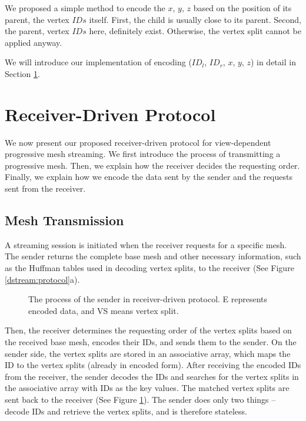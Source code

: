     We proposed a simple method to encode the $x$, $y$, $z$ based on the position
    of its parent, the vertex $IDs$ itself. First, the child is usually close to its
    parent. Second, the parent, vertex $IDs$ here, definitely exist. Otherwise, the vertex
    split cannot be applied anyway. 

    We will introduce our implementation of encoding ($ID_l$, $ID_r$, $x$, $y$, $z$) 
    in detail in Section \ref{s:dstream:protocol}.

\section{Receiver-Driven Protocol}
     \label{s:dstream:protocol}
	 We now present our proposed receiver-driven protocol
     for view-dependent progressive mesh streaming.
     We first introduce the process of transmitting 
     a progressive mesh. Then, we explain how the receiver decides the requesting order.
     Finally, we explain how we encode the data sent by the sender and the requests sent from the receiver.
     
     \subsection{Mesh Transmission} 
     A streaming session is initiated when the receiver requests for a specific
     mesh.
     The sender returns the complete base mesh and other necessary information,
     such as the Huffman tables used in decoding vertex splits, to the receiver
     (See Figure \ref{dstream:protocol}a).
     
     \begin{figure}
     \centering
     \caption[The process of the sender in receiver-driven protocol.]{The process of the sender in receiver-driven protocol. 
     E represents encoded data, and VS means vertex split. \label{dstream:process}}
     \end{figure}
     Then, the receiver determines
     the requesting order of the vertex splits based on the received base mesh, 
     encodes their IDs, and
     sends them to the sender. On the sender side, the vertex splits are stored
     in an associative array, which maps the ID to the vertex splits (already in encoded form). 
     After receiving the encoded IDs from the receiver, 
     the sender decodes the IDs and searches for the vertex splits 
     in the associative array
     with IDs as the key values. The matched vertex splits
     are sent back to the receiver (See Figure \ref{dstream:process}). 
     The sender does only two things -- decode IDs and retrieve the 
     vertex splits, and is therefore stateless. 

